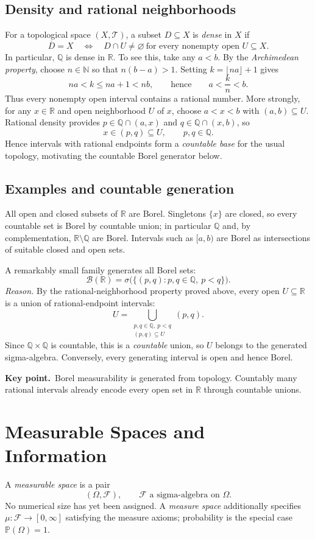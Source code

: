 \documentclass[10pt,a4paper]{article}
\newcommand{\N}{\mathbb N}
\newcommand{\R}{\mathbb R}
\newcommand{\Q}{\mathbb Q}
\newcommand{\B}{\mathcal B}
\newcommand{\key}[1]{\par\smallskip\textcolor{accent}{\textbf{Key point.}}\ #1\par}
\begin{document}
\subsection{Density and rational neighborhoods}
For a topological space $(X,\mathcal T)$, a subset $D\subseteq X$ is
\emph{dense} in $X$ if
\[
\boxed{\overline D=X\quad\Longleftrightarrow\quad
D\cap U\ne\varnothing\ \text{for every nonempty open }U\subseteq X.}
\]
In particular, $\Q$ is dense in $\R$. To see this, take any $a<b$.
By the \emph{Archimedean property}, choose $n\in\N$ so that
$n(b-a)>1$. Setting $k=\lfloor na\rfloor+1$ gives
\[
na<k\le na+1<nb,
\qquad\text{hence}\qquad a<\frac{k}{n}<b.
\]
Thus every nonempty open interval contains a rational number. More strongly,
for any $x\in\R$ and open neighborhood $U$ of $x$, choose
$a<x<b$ with $(a,b)\subseteq U$. Rational density provides
$p\in\Q\cap(a,x)$ and $q\in\Q\cap(x,b)$, so
\[
\boxed{x\in(p,q)\subseteq U,\qquad p,q\in\Q.}
\]
Hence intervals with rational endpoints form a \emph{countable base}
for the usual topology, motivating the countable Borel generator below.

\subsection{Examples and countable generation}
All open and closed subsets of $\R$ are Borel. Singletons $\{x\}$ are closed,
so every countable set is Borel by countable union; in particular
$\Q$ and, by complementation, $\R\setminus\Q$ are Borel. Intervals such as
$[a,b)$ are Borel as intersections of suitable closed and open sets.

A remarkably small family generates all Borel sets:
\[
\boxed{\B(\R)=\sigma\bigl(\{(p,q):p,q\in\Q,\ p<q\}\bigr).}
\]
\emph{Reason.} By the rational-neighborhood property proved above,
every open $U\subseteq\R$ is a union of rational-endpoint intervals:
\[
U=\bigcup_{\substack{p,q\in\Q,\ p<q\\(p,q)\subseteq U}}(p,q).
\]
Since $\Q\times\Q$ is countable, this is a \emph{countable} union, so
$U$ belongs to the generated sigma-algebra. Conversely, every generating
interval is open and hence Borel.

\key{Borel measurability is generated from topology. Countably many rational intervals already encode every open set in $\R$ through countable unions.}

\section{Measurable Spaces and Information}
A \emph{measurable space} is a pair
\[
\boxed{(\Omega,\mathcal F),\qquad\mathcal F\text{ a sigma-algebra on }\Omega.}
\]
No numerical size has yet been assigned. A \emph{measure space} additionally
specifies $\mu:\mathcal F\to[0,\infty]$ satisfying the measure axioms;
probability is the special case $\mathbb P(\Omega)=1$.
\end{document}
